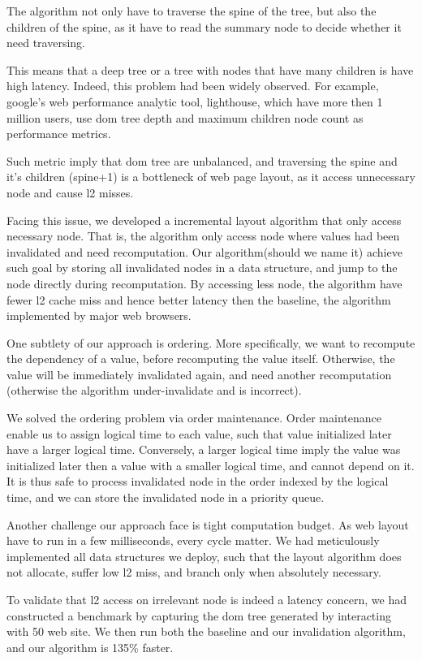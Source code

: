 \documentclass[format=acmsmall, review=false, screen=true]{acmart}
\begin{document}
The algorithm not only have to traverse the spine of the tree, but also the children of the spine, as it have to read the summary node to decide whether it need traversing.

This means that a deep tree or a tree with nodes that have many children is have high latency. Indeed, this problem had been widely observed. For example, google's web performance analytic tool, lighthouse, which have more then 1 million users, use dom tree depth and maximum children node count as performance metrics.

Such metric imply that dom tree are unbalanced, and traversing the spine and it's children (spine+1) is a bottleneck of web page layout, as it access unnecessary node and cause l2 misses. 

Facing this issue, we developed a incremental layout algorithm that only access necessary node. That is, the algorithm only access node where values had been invalidated and need recomputation. Our algorithm(should we name it) achieve such goal by storing all invalidated nodes in a data structure, and jump to the node directly during recomputation. By accessing less node, the algorithm have fewer l2 cache miss and hence better latency then the baseline, the algorithm implemented by major web browsers.

One subtlety of our approach is ordering. More specifically, we want to recompute the dependency of a value, before recomputing the value itself. Otherwise, the value will be immediately invalidated again, and need another recomputation (otherwise the algorithm under-invalidate and is incorrect).

We solved the ordering problem via order maintenance. Order maintenance enable us to assign logical time to each value, such that value initialized later have a larger logical time. Conversely, a larger logical time imply the value was initialized later then a value with a smaller logical time, and cannot depend on it. It is thus safe to process invalidated node in the order indexed by the logical time, and we can store the invalidated node in a priority queue.

Another challenge our approach face is tight computation budget. As web layout have to run in a few milliseconds, every cycle matter. We had meticulously implemented all data structures we deploy, such that the layout algorithm does not allocate, suffer low l2 miss, and branch only when absolutely necessary.

To validate that l2 access on irrelevant node is indeed a latency concern, we had constructed a benchmark by capturing the dom tree generated by interacting with 50 web site. We then run both the baseline and our invalidation algorithm, and our algorithm is 135\% faster.
\end{document}
